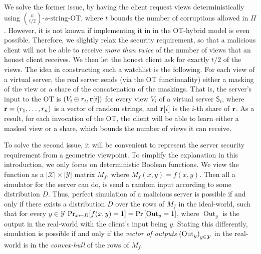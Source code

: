 \documentclass{llncs}
\newcommand{\sOT}[3]{\binom{#2}{#1}\text{-}#3\text{-string-OT}}
\newcommand{\X}{\mathcal{X}}
\newcommand{\Y}{\mathcal{Y}}
\newcommand{\Out}{\operatorname{Out}}
\renewcommand{\Sc}{\mathsf{S}}
\begin{document}
We solve the former issue, by having the client request views deterministically using $\sOT{t/2}{n}{s}$, where  $t$ bounds the number of corruptions allowed in $\Pi$. However, it is not known if implementing it in in the OT-hybrid model is even possible. Therefore, we slightly relax the security requirement, so that a malicious client will not be able to receive \emph{more than twice} of the number of views that an honest client receives. We then let the honest client ask for exactly $t/2$ of the views. The idea in constructing such a watchlist is the following. For each view of a virtual server, the real server sends (via the OT functionality) either a masking of the view or a share of the concatenation of the maskings. That is, the server's input to the OT is $(V_i\oplus r_i,{\bf r}[i])$ for every view $V_i$ of a virtual server $\Sc_i$, where ${\bf r}=\left ( r_1,\ldots,r_n \right )$ is a vector of random strings, and ${\bf r}[i]$ is the $i$-th share of ${\bf r}$. As a result, for each invocation of the OT, the client will be able to learn either a masked view or a share, which bounds the number of views it can receive.

To solve the second issue, it will be convenient to represent the server security requirement from a geometric viewpoint. To simplify the explanation in this introduction, we only focus on deterministic Boolean functions. We view the function as a $|\X|\times|\Y|$ matrix $M_f$, where $M_f(x,y)=f(x,y)$. Then all a simulator for the server can do, is send a random input according to some distribution $D$. Thus, perfect simulation of a malicious server is possible if and only if there exists a distribution $D$ over the rows of $M_f$ in the ideal-world, such that for every $y\in\Y$  $\Pr_{x\from D}[f(x,y)=1]=\pr{\Out_y=1}$, where $\Out_y$ is the output in the real-world with the client's input being $y$. Stating this differently, simulation is possible if and only if the \emph{vector of outputs} $\vect{\Out_y}_{y\in\Y}$ in the real-world is in the \emph{convex-hull} of the rows of $M_f$.
\end{document}
